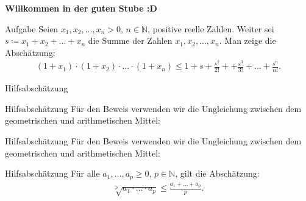 \documentclass[10pt]{beamer}
\title{}
\author{Artur's Mathematikstübchen}
\date{}
\def\bN{\mathbb{N}}
\begin{document}

\begin{frame}
    \begin{center}
        \textbf{\huge Willkommen in der guten Stube \newline \newline :D}
    \end{center}
\end{frame}




\begin{frame}
    \begin{alertblock}{Aufgabe}
        Seien \( x_{1}, x_{2}, \ldots, x_{n} > 0 \), \( n \in \bN \), positive reelle Zahlen. Weiter sei \( s \coloneq x_{1} + x_{2} + \ldots + x_{n} \) die Summe der Zahlen \( x_{1}, x_{2}, \ldots, x_{n} \). Man zeige die Abschätzung:
        \begin{align*}
            \left( 1 + x_{1} \right) \cdot \left( 1 + x_{2} \right) \cdot \ldots \cdot \left( 1 + x_{n} \right)
            \leq 1 + s + \frac{s^{2}}{2!} + + \frac{s^{3}}{3!} + \ldots + \frac{s^{n}}{n!}.
        \end{align*}
    \end{alertblock}
\end{frame}



\begin{frame}{Hilfsabschätzung}
    
\end{frame}



\begin{frame}{Hilfsabschätzung}
    Für den Beweis verwenden wir die Ungleichung zwischen dem geometrischen und arithmetischen Mittel:
\end{frame}



\begin{frame}{Hilfsabschätzung}
    Für den Beweis verwenden wir die Ungleichung zwischen dem geometrischen und arithmetischen Mittel:
    \begin{block}{Hilfsabschätzung}
        Für alle \( a_{1}, \ldots, a_{p} \geq 0 \), \( p \in \bN \), gilt die Abschätzung:
        \begin{align*}
            \sqrt[p]{a_{1} \cdot \ldots \cdot a_{p}} 
            \leq \frac{a_{1} + \ldots + a_{p}}{p}.
        \end{align*}
    \end{block}
\end{frame}
\end{document}
